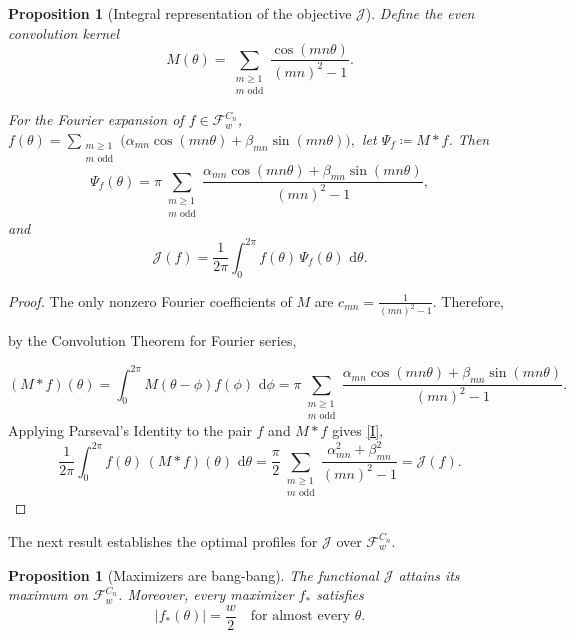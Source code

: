 \documentclass[11pt,letterpaper,reqno]{amsart}
\newcommand{\dd}{\,\mathrm{d}}
\newtheorem{proposition}[theorem]{Proposition}
\begin{document}

\begin{proposition}[Integral representation of the objective $\mathcal J$]
\label{prop:objective-kernel}
Define the even convolution kernel
\begin{equation} \label{K}
M(\theta) = \sum_{\substack{m\ge1\\m\text{ odd}}}\frac{\cos(mn\theta)}{(mn)^2-1}.  
\end{equation}

For the Fourier expansion of $f\in \mathcal F_w^{C_n}$,
$
f(\theta)=\sum_{\substack{m\ge1\\ m\text{ odd}}}\bigl(\alpha_{mn}\cos(mn\theta)+\beta_{mn}\sin(mn\theta)\bigr),
$
 let $\Psi_f\coloneqq M*f$. Then
\[
\Psi_f(\theta)=\pi \sum_{\substack{m\ge1\\m\text{ odd}}} \frac{\alpha_{mn}\cos (mn\theta) + \beta_{mn}\sin (mn\theta)}{(mn)^2-1},
\]
and
\begin{equation}\label{II}
    \mathcal J(f) = \frac{1}{2\pi}\int_0^{2\pi} f(\theta)\,\Psi_f(\theta)\,\dd\theta.
\end{equation}


\end{proposition}

\begin{proof}
The only nonzero Fourier coefficients of $M$ are
\(
c_{mn}=\frac{1}{(mn)^2-1}.
\)
Therefore, 
\begin{explanation}
by the Convolution Theorem for Fourier series,  
\end{explanation}
\[
(M*f)(\theta) = \int_0^{2\pi} M(\theta-\phi)f(\phi)\,\dd\phi
= \pi \sum_{\substack{m\ge1\\m\text{ odd}}} \frac{\alpha_{mn}\cos (mn\theta) + \beta_{mn}\sin (mn\theta)}{(mn)^2-1}.
\]
Applying Parseval's Identity to the pair $f$ and $M*f$ gives \eqref{I},
\[
\frac{1}{2\pi}\int_0^{2\pi} f(\theta)\,(M*f)(\theta)\,\dd\theta
=
\frac{\pi}{2}\sum_{\substack{m\ge1\\m\text{ odd}}}
\frac{\alpha_{mn}^2+\beta_{mn}^2}{(mn)^2-1}
=\mathcal J(f).
\]
\end{proof}

The next result establishes the optimal profiles for $\mathcal J$ over $\mathcal F_w^{C_n}$.
\begin{proposition}[Maximizers are bang-bang]
\label{prop:bang-bang-maximizer}
The functional $\mathcal J$ attains its maximum on $\mathcal F_w^{C_n}$. Moreover, every maximizer $f_*$ satisfies
\[
|f_*(\theta)|=\frac w2 \quad\text{for almost every }\theta.
\]
\end{proposition}
\end{document}
